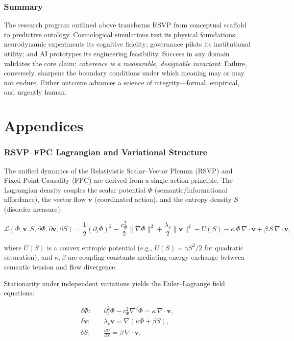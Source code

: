 \documentclass[12pt,a4paper]{article}
\begin{document}
\section*{Summary}

The research program outlined above transforms RSVP from conceptual scaffold to predictive ontology. Cosmological simulations test its physical foundations; neurodynamic experiments its cognitive fidelity; governance pilots its institutional utility; and AI prototypes its engineering feasibility. Success in any domain validates the core claim: \emph{coherence is a measurable, designable invariant}. Failure, conversely, sharpens the boundary conditions under which meaning may or may not endure. Either outcome advances a science of integrity—formal, empirical, and urgently human.

\clearpage
\appendix
\part*{Appendices}

\section{RSVP--FPC Lagrangian and Variational Structure}

The unified dynamics of the Relativistic Scalar--Vector Plenum (RSVP) and Fixed-Point Causality (FPC) are derived from a single action principle. The Lagrangian density couples the scalar potential $\Phi$ (semantic/informational affordance), the vector flow $\bm{v}$ (coordinated action), and the entropy density $S$ (disorder measure):

\begin{equation}
\mathcal{L}(\Phi,\bm{v},S,\partial\Phi,\partial\bm{v},\partial S)
= \frac{1}{2} (\partial_t \Phi)^2
- \frac{c_\Phi^2}{2} \|\nabla \Phi\|^2
+ \frac{\lambda_v}{2} \|\bm{v}\|^2
- U(S)
- \kappa \, \Phi \, \nabla\!\cdot\!\bm{v}
+ \beta \, S \, \nabla\!\cdot\!\bm{v},
\end{equation}

where $U(S)$ is a convex entropic potential (e.g., $U(S) = \gamma S^2 / 2$ for quadratic saturation), and $\kappa, \beta$ are coupling constants mediating energy exchange between semantic tension and flow divergence.

Stationarity under independent variations yields the Euler--Lagrange field equations:

\begin{align}
\delta \Phi: \quad
&\partial_t^2 \Phi - c_\Phi^2 \nabla^2 \Phi = \kappa \, \nabla\!\cdot\!\bm{v}, \\[4pt]
\delta \bm{v}: \quad
&\lambda_v \bm{v} = \nabla (\kappa \Phi + \beta S), \\[4pt]
\delta S: \quad
&\frac{dU}{dS} = \beta \, \nabla\!\cdot\!\bm{v}.
\end{align}
\end{document}
